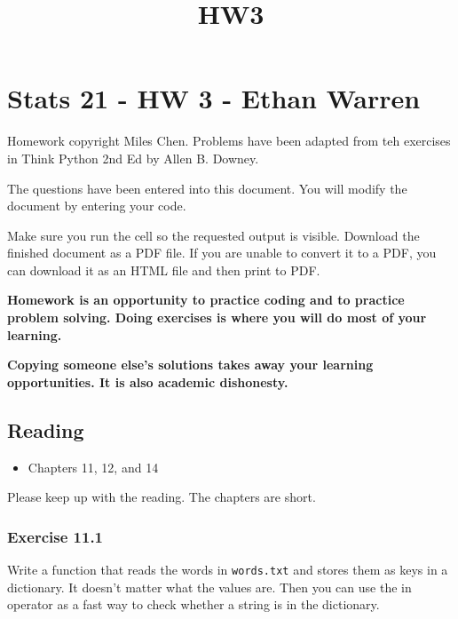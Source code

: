 \documentclass[11pt]{article}
\title{HW3}
\providecommand{\tightlist}{%
      \setlength{\itemsep}{0pt}\setlength{\parskip}{0pt}}
\begin{document}
    
    \maketitle
    
    

    
    \hypertarget{stats-21---hw-3---ethan-warren}{%
\section{Stats 21 - HW 3 - Ethan
Warren}\label{stats-21---hw-3---ethan-warren}}

    Homework copyright Miles Chen. Problems have been adapted from teh
exercises in Think Python 2nd Ed by Allen B. Downey.

The questions have been entered into this document. You will modify the
document by entering your code.

Make sure you run the cell so the requested output is visible. Download
the finished document as a PDF file. If you are unable to convert it to
a PDF, you can download it as an HTML file and then print to PDF.

\textbf{Homework is an opportunity to practice coding and to practice
problem solving. Doing exercises is where you will do most of your
learning.}

\textbf{Copying someone else's solutions takes away your learning
opportunities. It is also academic dishonesty.}

    \hypertarget{reading}{%
\subsection{Reading}\label{reading}}

\begin{itemize}
\tightlist
\item
  Chapters 11, 12, and 14
\end{itemize}

Please keep up with the reading. The chapters are short.

    \hypertarget{exercise-11.1}{%
\subsubsection{Exercise 11.1}\label{exercise-11.1}}

Write a function that reads the words in \texttt{words.txt} and stores
them as keys in a dictionary. It doesn't matter what the values are.
Then you can use the in operator as a fast way to check whether a string
is in the dictionary.
\end{document}
